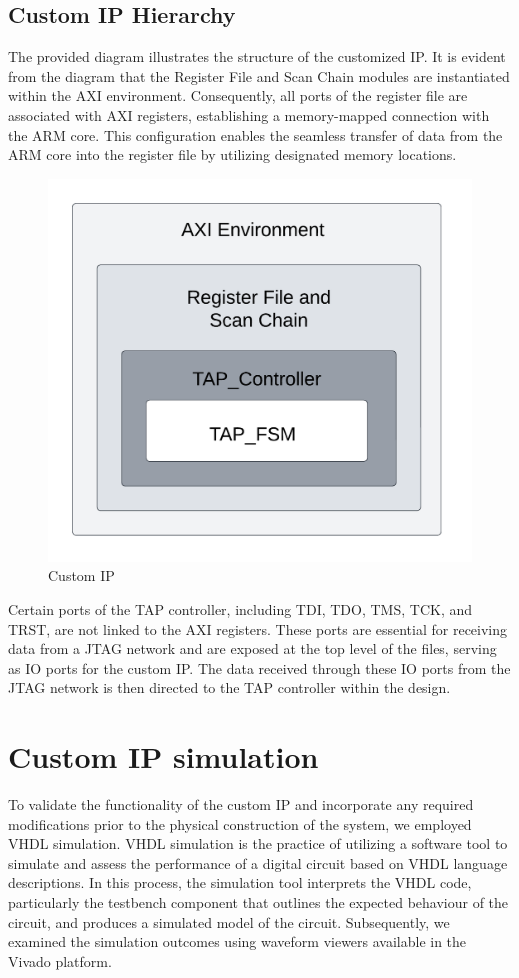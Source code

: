 \subsection{Custom IP Hierarchy}

The provided diagram illustrates the structure of the customized IP. It is evident from the diagram that the Register File and Scan Chain modules are instantiated within the AXI environment. Consequently, all ports of the register file are associated with AXI registers, establishing a memory-mapped connection with the ARM core. This configuration enables the seamless transfer of data from the ARM core into the register file by utilizing designated memory locations.

\begin{figure}[h]
    \centering
    \includegraphics[width=0.5\linewidth]{Image/Heirarachy.png}
    \caption{Custom IP}
    \label{fig:enter-label}
\end{figure}

\vspace{2mm}

Certain ports of the TAP controller, including TDI, TDO, TMS, TCK, and TRST, are not linked to the AXI registers. These ports are essential for receiving data from a JTAG network and are exposed at the top level of the files, serving as IO ports for the custom IP. The data received through these IO ports from the JTAG network is then directed to the TAP controller within the design. 



 



\section{Custom IP simulation}

To validate the functionality of the custom IP and incorporate any required modifications prior to the physical construction of the system, we employed VHDL simulation. VHDL simulation is the practice of utilizing a software tool to simulate and assess the performance of a digital circuit based on VHDL language descriptions. In this process, the simulation tool interprets the VHDL code, particularly the testbench component that outlines the expected behaviour of the circuit, and produces a simulated model of the circuit. Subsequently, we examined the simulation outcomes using waveform viewers available in the Vivado platform.
